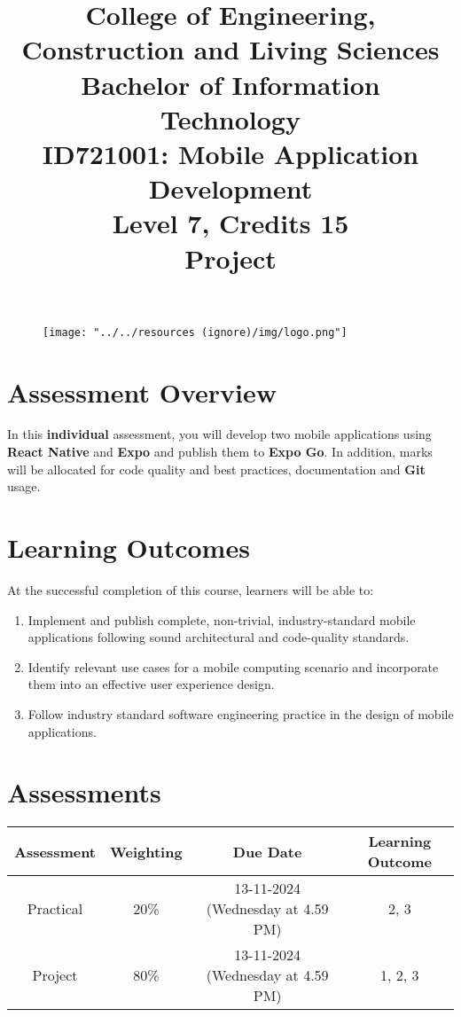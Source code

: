 \documentclass{article}
\author{}
\begin{document}
\begin{figure}
  \centering
  \texttt{[image: "../../resources (ignore)/img/logo.png"]}
\end{figure}

\title{College of Engineering, Construction and Living Sciences\\Bachelor of Information Technology\\ID721001: Mobile Application Development\\Level 7, Credits 15\\\textbf{Project}}
\date{}
\maketitle

\section*{Assessment Overview}
In this \textbf{individual} assessment, you will develop two mobile applications using \textbf{React Native} and \textbf{Expo} and publish them to \textbf{Expo Go}. In addition, marks will be allocated for code quality and best practices, documentation and \textbf{Git} usage. 

\section*{Learning Outcomes}
At the successful completion of this course, learners will be able to:
\begin{enumerate}
  \item Implement and publish complete, non-trivial, industry-standard mobile applications following sound architectural and code-quality standards.
  \item Identify relevant use cases for a mobile computing scenario and incorporate them into an effective user experience design.
  \item Follow industry standard software engineering practice in the design of mobile applications.
\end{enumerate}

\section*{Assessments}
\renewcommand{\arraystretch}{1.5}
\begin{tabular}{|c|c|c|c|}
  \hline
  \textbf{Assessment}                                 & \textbf{Weighting} & \textbf{Due Date}            & \textbf{Learning Outcome} \\ \hline
  \small Practical & \small 20\%        & \small 13-11-2024 (Wednesday at 4.59 PM)   & \small 2, 3                   \\ \hline
  \small Project                 & \small 80\%        & \small 13-11-2024 (Wednesday at 4.59 PM) \small  & \small 1, 2, 3                   \\ \hline
\end{tabular}
\end{document}

